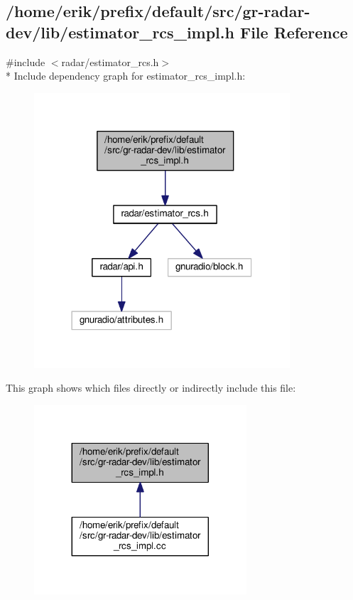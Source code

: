 \subsection{/home/erik/prefix/default/src/gr-\/radar-\/dev/lib/estimator\+\_\+rcs\+\_\+impl.h File Reference}
\label{estimator__rcs__impl_8h}
{\ttfamily \#include $<$radar/estimator\+\_\+rcs.\+h$>$}\\*
Include dependency graph for estimator\+\_\+rcs\+\_\+impl.\+h\+:
\nopagebreak
\begin{figure}[H]
\begin{center}
\leavevmode
\includegraphics[width=270pt]{d1/d2e/estimator__rcs__impl_8h__incl}
\end{center}
\end{figure}
This graph shows which files directly or indirectly include this file\+:
\nopagebreak
\begin{figure}[H]
\begin{center}
\leavevmode
\includegraphics[width=224pt]{d1/d05/estimator__rcs__impl_8h__dep__incl}
\end{center}
\end{figure}
